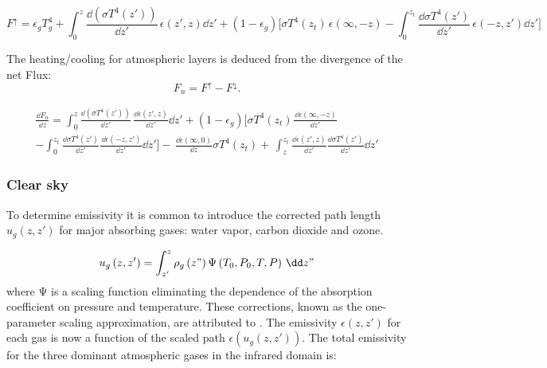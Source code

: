 \begin{equation}
F^\uparrow =\epsilon_{g}T_{g}^{4}+\int_0^z {\frac{\dd\left( \sigma
T^{4}\left( z' \right) \right)}{\dd z'}\, \epsilon \left( z',z
\right)\dd z'+\left( 1-\epsilon_{g} \right)[\sigma T^{4}} \left( z_t
\right)\, \epsilon \left( \infty ,-z \right)-\int_0^{z_t} \frac{\dd\sigma
T^{4}\left( z' \right)}{\dd z'} \, \epsilon (-z,z') \dd z']
\end{equation}

The heating/cooling for atmospheric layers is deduced from the divergence of
the net Flux:
\begin{equation}
F_{n}=F^\uparrow -F^\downarrow .
\end{equation}

\begin{multline}
\frac{\dd F_{n}}{\dd z}=\int_0^z {\frac{\dd\left( \sigma T^{4}\left( z' \right)
\right)}{\dd z'}\, \frac{\dd \epsilon \left( z',z
\right)}{\dd z'}\dd z'
+\left( 1-\epsilon_{g} \right)[\sigma T^{4}} \left(z_t \right)\frac{\, \dd\epsilon \left( \infty ,-z \right)}{\dd z'}\\
-\int_0^{z_t} \frac{\dd\sigma T^{4}\left( z' \right)}{\dd z'} \frac{\, \dd\epsilon \left( -z,z' \right)}{\dd z'}\dd z']
-\, \frac{\dd\epsilon \left( \infty ,0 \right)}{\dd z}\sigma T^{4}\left( z_t \right)
+\, \int_z^{z_t} {\frac{\dd\epsilon (z',z)}{\dd z'}\frac{\dd\sigma T^{4}(z')}{\dd z'}\dd z'}
\end{multline}

\subsubsection{Clear sky}
To determine emissivity it is common to introduce the corrected path length
$u_{g}(z,z')$ for major absorbing gases: water vapor, carbon dioxide and ozone.

\begin{equation}
u_{g}\left( z,z' \right)=\int_{z'}^{z} \rho_{g} \left( z"
\right)\mathrm{\Psi }\left( T_{0},P_{0},T,P \right)\, \dd z"
\end{equation}
where $\mathrm{\Psi }$ is a scaling function eliminating the dependence of
the absorption coefficient on pressure and temperature. These corrections,
known as the one-parameter scaling approximation, are attributed to \cite{Chou:1980}.
The emissivity $\epsilon(z,z')$ for each gas is now a
function of the scaled path $\epsilon (u_{g}(z,z'))$. The total emissivity for
the three dominant atmospheric gases in the infrared domain is:

